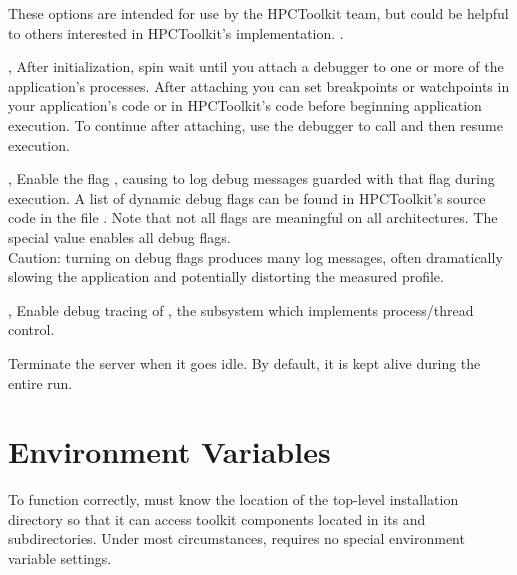 \documentclass[english]{article}
\begin{document}
\begin{Description}

These options are intended for use by the HPCToolkit team,
but could be helpful to others interested in HPCToolkit's implementation.
.
 
\item[\Opt{-d}, \Opt{--debug}]
After initialization, spin wait until you attach a debugger
to one or more of the application's processes.
After attaching you can set breakpoints or watchpoints in your application's code
or in HPCToolkit's  code before beginning application execution.
To continue after attaching, use the debugger to call 
and then resume execution.

\item[\OptArg{-dd}{flag}, \OptArg{--dynamic-debug}{flag}]
Enable the flag ,
causing  to log debug messages guarded with that flag
during execution.
A list of dynamic debug flags can be found in HPCToolkit's source code
in the file .
Note that not all flags are meaningful on all architectures.
The special value  enables all debug flags.
\\
Caution: turning on debug flags produces many log messages,
often dramatically slowing the application and potentially distorting the measured profile.

\item[\Opt{-md}, \Opt{--monitor-debug}]
Enable debug tracing of , the  subsystem which implements process/thread control.

\item[\Opt{--fnbounds-eager-shutdown}]
Terminate the   server when it goes idle.  By default, it is kept alive during the entire run.

\end{Description}



\section{Environment Variables}
To function correctly,  must know the location of the  
top-level installation directory so that it can access toolkit components located 
in its  and  subdirectories. 
Under most circumstances,  requires no special environment variable settings.
\end{document}
